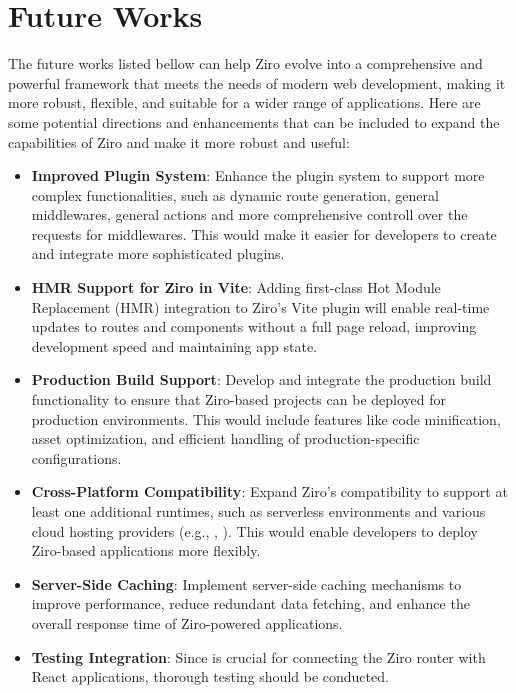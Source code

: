 \section{Future Works} %

The future works listed bellow can help Ziro evolve into a comprehensive and powerful framework that meets the needs of modern web development, making it more robust, flexible, and suitable for a wider range of applications. Here are some potential directions and enhancements that can be included to expand the capabilities of Ziro and make it more robust and useful:

\begin{itemize}


	\item  \textbf{Improved Plugin System}: Enhance the plugin system to support more complex functionalities, such as dynamic route generation, general middlewares, general actions and more comprehensive controll over the requests for middlewares. This would make it easier for developers to create and integrate more sophisticated plugins.

	\item \textbf{HMR Support for Ziro in Vite}: Adding first-class Hot Module Replacement (HMR) integration to Ziro's Vite plugin will enable real-time updates to routes and components without a full page reload, improving development speed and maintaining app state.


	\item \textbf{Production Build Support}: Develop and integrate the production build functionality to ensure that Ziro-based projects can be  deployed for production environments. This would include features like code minification, asset optimization, and efficient handling of production-specific configurations.

	\item  \textbf{Cross-Platform Compatibility}: Expand Ziro's compatibility to support at least one additional runtimes, such as serverless environments and various cloud hosting providers (e.g., , ). This would enable developers to deploy Ziro-based applications more flexibly.

	\item  \textbf{Server-Side Caching}: Implement server-side caching mechanisms to improve performance, reduce redundant data fetching, and enhance the overall response time of Ziro-powered applications.

	\item \textbf{Testing  Integration}: Since  is crucial for connecting the Ziro router with React applications, thorough testing should be conducted.



\end{itemize}
